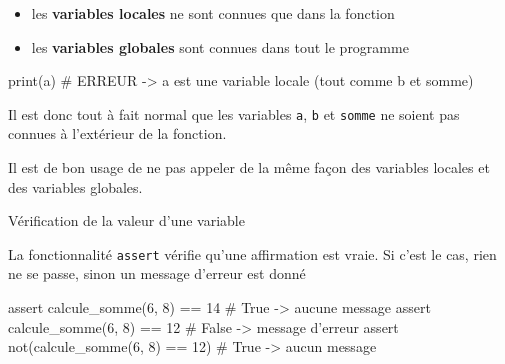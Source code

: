 \begin{remarque}
	
	\begin{itemize}
		\item les \textbf{variables locales} ne sont connues que dans la fonction
		\item les \textbf{variables globales} sont connues dans tout le programme
	\end{itemize}

\begin{CodePythontexAlt}[Centre,PremLigne=1, Lignes=false,]{}
print(a)   # ERREUR -> a est une variable locale (tout comme b et somme)
\end{CodePythontexAlt}

Il est donc tout à fait normal que les variables \verb+a+, \verb+b+ et \verb+somme+ ne soient pas connues à l'extérieur de la fonction.

Il est de bon usage de ne pas appeler de la même façon des variables locales et des variables globales.


\end{remarque}

\medskip


\begin{easybox}{Vérification de la valeur d'une variable}{}

La fonctionnalité \verb+assert+ vérifie qu'une affirmation est vraie. Si c'est le cas, rien ne se passe, sinon un message d'erreur est donné
\begin{CodePythontexAlt}[Centre,PremLigne=1, Lignes=false,]{}
assert calcule_somme(6, 8) == 14     	# True -> aucune message 
assert calcule_somme(6, 8) == 12     	# False -> message d'erreur 
assert not(calcule_somme(6, 8) == 12)	# True -> aucun message

\end{CodePythontexAlt}
\end{easybox}

